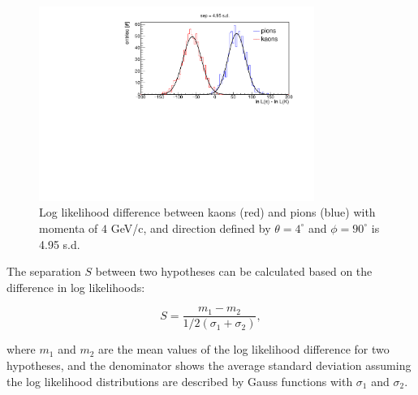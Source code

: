 \begin{figure}[!h]
\centering
\includegraphics[clip, trim=0cm 0cm 0cm 0.7cm, width=0.8\textwidth]{pics/hLnDiff.pdf}
\caption{\label{pic:sepLUT}
Log likelihood difference between kaons (red) and pions (blue) with momenta of $4$ GeV/c, and direction defined by $\theta = 4^{\circ}$ and $\phi = 90^{\circ}$ is 4.95 s.d.
}
\end{figure}

The separation $S$ between two hypotheses can be calculated based on the difference in log likelihoods:

\begin{equation}
S = \frac{m_{1}-m_{2}}{1/2(\sigma_{1} + \sigma_{2})},
\end{equation}

\noindent where $m_{1}$ and $m_{2}$ are the mean values of the log likelihood difference for two hypotheses, and the denominator shows the average standard deviation assuming the log likelihood distributions are described by Gauss functions with $\sigma_{1}$ and $\sigma_{2}$.